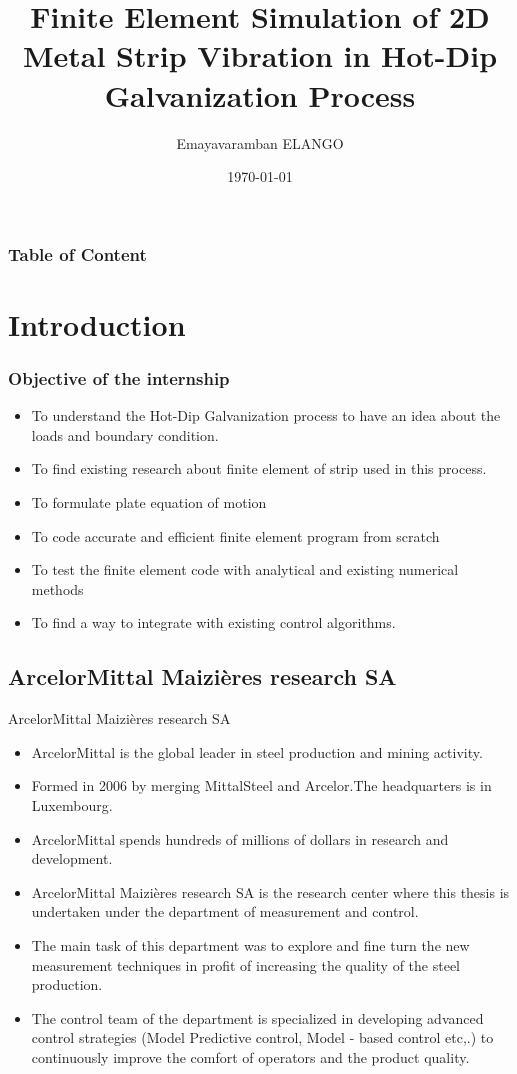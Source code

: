 \documentclass[9pt]{beamer}
\title{Finite Element Simulation of 2D Metal Strip Vibration in
Hot-Dip Galvanization Process}
\author{Emayavaramban ELANGO}
\institute{\'Ecole centrale De Nantes}
\date{\today}
\begin{document}

\frame{\titlepage}


\begin{frame}
\frametitle{Table of Content}
\tableofcontents
\end{frame}
\section{Introduction}

\begin{frame}
\frametitle{Objective of the internship}
\begin{itemize}
\item To understand the Hot-Dip Galvanization process to have an idea about the loads and boundary condition.
\item To find existing research about finite element of strip used in this process.
\item To formulate plate equation of motion
\item To code accurate and efficient finite element program from scratch
\item To test the finite element code with analytical and existing numerical methods
\item To find a way to integrate with existing control algorithms.
 


\end{itemize}

\end{frame}


\subsection{ArcelorMittal Maizi\`eres research SA}
\begin{frame}{ArcelorMittal Maizi\`eres research SA}
\begin{itemize}
\item ArcelorMittal is the global leader in steel production and mining activity.
\item Formed in 2006 by merging MittalSteel and Arcelor.The headquarters is in Luxembourg.
\item ArcelorMittal spends hundreds of millions of dollars in research and development.
\item ArcelorMittal Maizi\`eres research SA is the research center where this thesis is undertaken under the department of measurement and control.
\item The main task of this department was to explore and fine turn the new measurement techniques in profit of increasing the quality of the steel production. 
\item The control team of the department is specialized in developing advanced control strategies (Model Predictive control, Model - based control etc,.) to continuously improve the comfort of operators and the product quality.


\end{itemize}

\end{frame}
\end{document}
